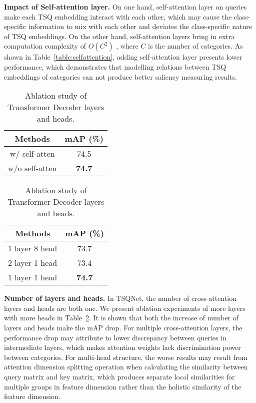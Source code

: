 \documentclass[runningheads]{llncs}
\newcommand{\tabref}[1]{Table~\ref{#1}}
\begin{document}
\noindent \textbf{Impact of Self-attention layer.}
On one hand, self-attention layer on queries make each TSQ embedding interact with each other, which may cause the class-specific information to mix with each other and deviates the class-specific nature of TSQ embeddings. On the other hand, self-attention layers bring in extra computation complexity of $O(C^{2})$ ,  where $C$ is the number of categories.
As shown in \tabref{table:selfattention}, adding self-attention layer presents lower performance, which demonstrates that modelling relations between TSQ embeddings of categories can not produce better saliency measuring results. 


\begin{table}
\centering
\begin{minipage}[t]{0.45\textwidth}
\centering
\caption{Ablation study of the usage of self-attention.}
\label{table:selfattention}
\renewcommand{\arraystretch}{1.3}
\begin{tabular}{cc}
\toprule
Methods & mAP (\%) \\
\midrule
w/ self-atten &  74.5  \\
w/o self-atten & \textbf{74.7} \\
\bottomrule
\end{tabular}
\end{minipage}
\hfill
\begin{minipage}[t]{0.45\textwidth}
\centering
\caption{Ablation study of Transformer Decoder layers and heads.}
\label{table:layerhead}
\begin{tabular}{cc}
\toprule
Methods & mAP (\%) \\
\midrule
1 layer 8 head & 73.7 \\
2 layer 1 head & 73.4 \\
1 layer 1 head &  \textbf{74.7}  \\
\bottomrule
\end{tabular}
\end{minipage}
\end{table}


\noindent \textbf{Number of layers and heads.}
In TSQNet, the number of cross-attention layers and heads are both one. We present ablation experiments of more layers with more heads in \tabref{table:layerhead}. It is shown that both the increase of number of layers and heads make the mAP drop. For multiple cross-attention layers, the performance drop may attribute to lower discrepancy between queries in intermediate layers, which makes attention weights lack discrimination power between categories.
For multi-head structure, the worse results may result from attention dimension splitting operation when calculating the similarity between query matrix and key matrix, which produces separate local similarities for multiple groups in feature dimension rather than the holistic similarity of the feature dimension.
\end{document}

